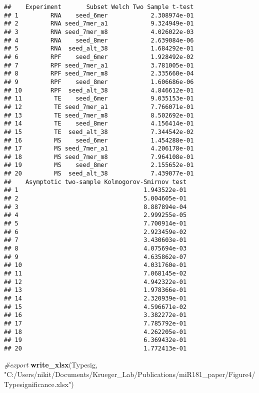 \documentclass[
]{article}
\newenvironment{Shaded}{\begin{snugshade}}{\end{snugshade}}
\newcommand{\CommentTok}[1]{\textcolor[rgb]{0.56,0.35,0.01}{\textit{#1}}}
\newcommand{\FunctionTok}[1]{\textcolor[rgb]{0.13,0.29,0.53}{\textbf{#1}}}
\newcommand{\NormalTok}[1]{#1}
\newcommand{\StringTok}[1]{\textcolor[rgb]{0.31,0.60,0.02}{#1}}
\begin{document}
\begin{verbatim}
##    Experiment       Subset Welch Two Sample t-test
## 1         RNA    seed_6mer            2.308974e-01
## 2         RNA seed_7mer_a1            9.324949e-01
## 3         RNA seed_7mer_m8            4.026022e-03
## 4         RNA    seed_8mer            2.639084e-06
## 5         RNA  seed_alt_38            1.684292e-01
## 6         RPF    seed_6mer            1.928492e-02
## 7         RPF seed_7mer_a1            3.781005e-01
## 8         RPF seed_7mer_m8            2.335660e-04
## 9         RPF    seed_8mer            1.606686e-06
## 10        RPF  seed_alt_38            4.846612e-01
## 11         TE    seed_6mer            9.035153e-01
## 12         TE seed_7mer_a1            7.766071e-01
## 13         TE seed_7mer_m8            8.502692e-01
## 14         TE    seed_8mer            4.156414e-01
## 15         TE  seed_alt_38            7.344542e-02
## 16         MS    seed_6mer            1.454288e-01
## 17         MS seed_7mer_a1            4.206178e-01
## 18         MS seed_7mer_m8            7.964108e-01
## 19         MS    seed_8mer            2.155652e-01
## 20         MS  seed_alt_38            7.439077e-01
##    Asymptotic two-sample Kolmogorov-Smirnov test
## 1                                   1.943522e-01
## 2                                   5.004605e-01
## 3                                   8.887894e-04
## 4                                   2.999255e-05
## 5                                   7.700914e-01
## 6                                   2.923459e-02
## 7                                   3.430603e-01
## 8                                   4.075694e-03
## 9                                   4.635862e-07
## 10                                  4.031760e-01
## 11                                  7.068145e-02
## 12                                  4.942322e-01
## 13                                  1.978366e-01
## 14                                  2.320939e-01
## 15                                  4.596671e-02
## 16                                  3.382272e-01
## 17                                  7.785792e-01
## 18                                  4.262205e-01
## 19                                  6.369432e-01
## 20                                  1.772413e-01
\end{verbatim}

\begin{Shaded}
\begin{Highlighting}[]
\CommentTok{\#export}
\FunctionTok{write\_xlsx}\NormalTok{(Typesig, }\StringTok{"C:/Users/nikit/Documents/Krueger\_Lab/Publications/miR181\_paper/Figure4/Typesignificance.xlsx"}\NormalTok{)}
\end{Highlighting}
\end{Shaded}
\end{document}
